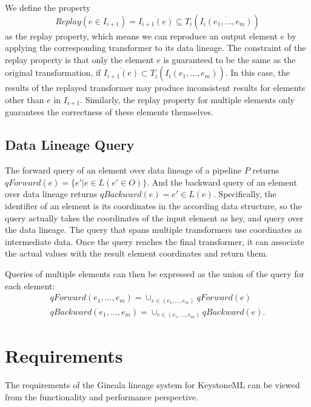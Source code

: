 \documentclass{sig-alternate}
\begin{document}
We define the property 
\begin{equation}
Replay(e \in I_{i+1}) = \overline{I_{i+1}(e)} \subseteq T_i(\overline{I_i(e_1, ..., e_m)})
\end{equation}
as the replay property, which means we can reproduce an output element $e$ by applying the corresponding transformer to its data lineage.
The constraint of the replay property is that only the element $e$ is guaranteed to be the same as the original transformation,
if $\overline{I_{i+1}(e)} \subset T_i(\overline{I_i(e_1, ..., e_m)})$. 
In this case, the results of the replayed transformer may produce inconsistent results for elements other than $e$ in $I_{i+1}$. 
Similarly, the replay property for multiple elements only guarantees the correctness of these elements themselves.

\subsection{Data Lineage Query}
The forward query of an element over data lineage of a pipeline $P$ returns $qForward(e) = \{e' | e \in L(e' \in O)\}$. 
And the backward query of an element over data lineage returns $qBackward(e) = e' \in L(e)$.
Specifically, the identifier of an element is its coordinates in the according data structure, so the query actually takes
the coordinates of the input element as key, and query over the data lineage. The query that spans multiple transformers 
use coordinates as intermediate data. Once the query reaches the final transformer, it can associate the actual values
with the result element coordinates and return them.

Queries of multiple elements can then be expressed as the union of the query for each element: 
\begin{equation}
\begin{split}
qForward(e_1, ..., e_m) = \cup_{e \in (e_1, ..., e_m)} qForward(e) \\
qBackward(e_1, ..., e_m) = \cup_{e \in (e_1, ..., e_m)} qBackward(e).
\end{split}
\end{equation}

\section{Requirements}
\label{sec:Req}
The requirements of the Gineala lineage system for KeystoneML can be viewed from the functionality and performance perspective.
\end{document}
